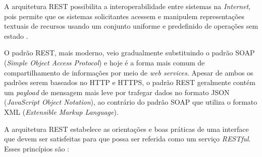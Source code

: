 A arquitetura REST possibilita a interoperabilidade entre sistemas na \textit{Internet}, pois permite que os sistemas solicitantes acessem e manipulem representações textuais de recursos usando um conjunto uniforme e predefinido de operações sem estado \cite{ferris2004webservices}.

O padrão REST, mais moderno, veio gradualmente substituindo o padrão SOAP (\textit{Simple Object Access Protocol}) e hoje é a forma mais comum de compartilhamento de informações por meio de \textit{web services}. Apesar de ambos os padrões serem baseados no HTTP e HTTPS, o padrão REST geralmente contém um \textit{payload} de mensagem mais leve por trafegar dados no formato JSON (\textit{JavaScript Object Notation}), ao contrário do padrão SOAP que utiliza o formato XML (\textit{Extensible Markup Language}).

A arquitetura REST estabelece as orientações e boas práticas de uma interface que devem ser satisfeitas  para que possa ser referida como um serviço \textit{RESTful}. Esses princípios são \cite{fielding2000rest}:

